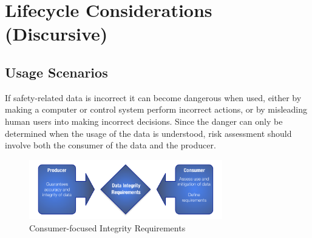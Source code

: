 %
%
\section{Lifecycle Considerations (Discursive)} \label{bkm:lifecycle}


\subsection{Usage Scenarios}
If safety-related data is incorrect it can become dangerous when used, either by making a computer or control system perform incorrect actions, or by misleading human users into making incorrect decisions. Since the danger can only be determined when the usage of the data is understood, risk assessment should involve both the consumer of the data and the producer.

\begin{figure}[htbp]
  \centering
  \includegraphics[width=0.75\textwidth]{images/producerconsumer}
  \caption{Consumer-focused Integrity Requirements}
  \label{fig:producerconsumer}
\end{figure}

